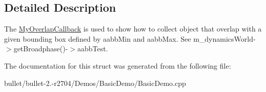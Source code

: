 \subsection{Detailed Description}
The \hyperlink{struct_my_overlap_callback}{My\+Overlap\+Callback} is used to show how to collect object that overlap with a given bounding box defined by aabb\+Min and aabb\+Max. See m\+\_\+dynamics\+World-\/$>$get\+Broadphase()-\/$>$aabb\+Test. 

The documentation for this struct was generated from the following file\+:\begin{DoxyCompactItemize}
\item 
bullet/bullet-\/2.-\/r2704/\+Demos/\+Basic\+Demo/Basic\+Demo.\+cpp\end{DoxyCompactItemize}
